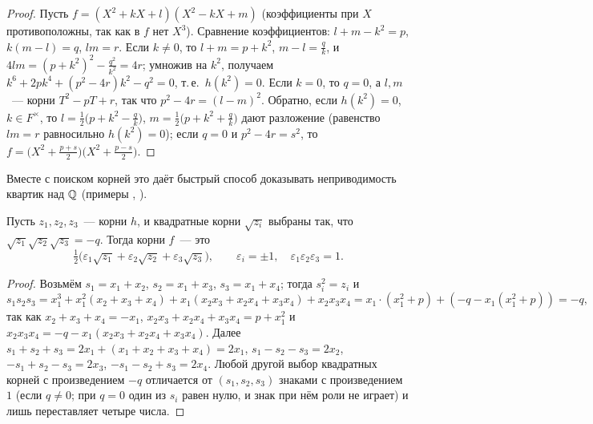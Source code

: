 \begin{proof}
Пусть $f=(X^2+kX+l)(X^2-kX+m)$ (коэффициенты при $X$ противоположны, так как в $f$ нет $X^3$). Сравнение коэффициентов:
$l+m-k^2=p$, $k(m-l)=q$, $lm=r$. Если $k\ne0$, то $l+m=p+k^2$, $m-l=\frac qk$, и $4lm=(p+k^2)^2-\frac{q^2}{k^2}=4r$; умножив на $k^2$,
получаем $k^6+2pk^4+(p^2-4r)k^2-q^2=0$, т.\,е.\ $h(k^2)=0$. Если $k=0$, то $q=0$, а $l,m$~--- корни $T^2-pT+r$, так что
$p^2-4r=(l-m)^2$. Обратно, если $h(k^2)=0$, $k\in F^\times$, то $l=\frac12\bigl(p+k^2-\frac qk\bigr)$, $m=\frac12\bigl(p+k^2+\frac qk\bigr)$ дают
разложение (равенство $lm=r$ равносильно $h(k^2)=0$); если $q=0$ и $p^2-4r=s^2$, то $f=\bigl(X^2+\frac{p+s}2\bigr)\bigl(X^2+\frac{p-s}2\bigr)$.
\end{proof}

Вместе с поиском корней это даёт быстрый способ доказывать неприводимость квартик над $\mathbb Q$ (примеры , ).

\begin{theorem}
Пусть $z_1,z_2,z_3$~--- корни $h$, и квадратные корни $\sqrt{z_i}$ выбраны так, что $\sqrt{z_1}\sqrt{z_2}\sqrt{z_3}=-q$. Тогда корни $f$~--- это
\[
\tfrac12\bigl(\varepsilon_1\sqrt{z_1}+\varepsilon_2\sqrt{z_2}+\varepsilon_3\sqrt{z_3}\bigr),\qquad \varepsilon_i=\pm1,\quad \varepsilon_1\varepsilon_2\varepsilon_3=1 .
\]
\end{theorem}

\begin{proof}
Возьмём $s_1=x_1+x_2$, $s_2=x_1+x_3$, $s_3=x_1+x_4$; тогда $s_i^2=z_i$ и
\[
s_1s_2s_3=x_1^3+x_1^2(x_2+x_3+x_4)+x_1(x_2x_3+x_2x_4+x_3x_4)+x_2x_3x_4=x_1\cdot(x_1^2+p)+(-q-x_1(x_1^2+p))=-q,
\]
так как $x_2+x_3+x_4=-x_1$, $x_2x_3+x_2x_4+x_3x_4=p+x_1^2$ и $x_2x_3x_4=-q-x_1(x_2x_3+x_2x_4+x_3x_4)$. Далее
$s_1+s_2+s_3=2x_1+(x_1+x_2+x_3+x_4)=2x_1$, $s_1-s_2-s_3=2x_2$, $-s_1+s_2-s_3=2x_3$, $-s_1-s_2+s_3=2x_4$. Любой другой выбор
квадратных корней с произведением $-q$ отличается от $(s_1,s_2,s_3)$ знаками с произведением $1$ (если $q\ne0$; при $q=0$ один
из $s_i$ равен нулю, и знак при нём роли не играет) и лишь переставляет четыре числа.
\end{proof}

